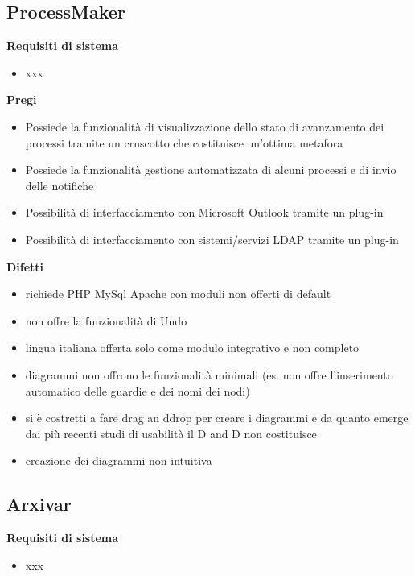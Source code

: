 	\subsection{ProcessMaker}
	
	
\textbf{Requisiti di sistema}	
	\begin{itemize}
		\item xxx	
	\end{itemize}		

\textbf{Pregi}	
	
\begin{itemize}
		\item Possiede la funzionalità di visualizzazione dello stato di avanzamento dei processi tramite un cruscotto che costituisce un'ottima metafora		
\item Possiede la funzionalità gestione automatizzata di alcuni processi e di invio delle notifiche
		\item Possibilità di interfacciamento con Microsoft Outlook tramite un plug-in 
		\item Possibilità di interfacciamento con sistemi/servizi LDAP tramite un plug-in
					
		\end{itemize}



\textbf{Difetti}	
	\begin{itemize}
		\item richiede PHP MySql Apache con moduli non offerti di default
		\item non offre la funzionalità di Undo
		\item lingua italiana offerta solo come modulo integrativo e non completo
		\item diagrammi non offrono le funzionalità minimali (es. non offre l'inserimento automatico delle guardie  e dei nomi 					dei nodi)
		\item si è costretti a fare drag an ddrop per creare i diagrammi e da quanto emerge dai più recenti studi di usabilità il D and D non costituisce  
		\item creazione dei diagrammi non intuitiva		
				
		
	\end{itemize}
	

		

	\subsection{Arxivar}
\textbf{Requisiti di sistema}	
	\begin{itemize}
		\item xxx	
	\end{itemize}


